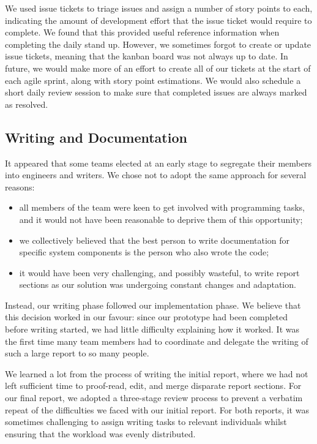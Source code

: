 We used issue tickets to triage issues and assign a number of story points to each, indicating the amount of development effort that the issue ticket would require to complete. We found that this provided useful reference information when completing the daily stand up. However, we sometimes forgot to create or update issue tickets, meaning that the kanban board was not always up to date. In future, we would make more of an effort to create all of our tickets at the start of each agile sprint, along with story point estimations. We would also schedule a short daily review session to make sure that completed issues are always marked as resolved.

\subsection{Writing and Documentation}
It appeared that some teams elected at an early stage to segregate their members into engineers and writers. We chose not to adopt the same approach for several reasons:

\begin{itemize}[noitemsep, topsep=1pt]
	\item all members of the team were keen to get involved with programming tasks, and it would not have been reasonable to deprive them of this opportunity;
	\item we collectively believed that the best person to write documentation for specific system components is the person who also wrote the code;
	\item it would have been very challenging, and possibly wasteful, to write report sections as our solution was undergoing constant changes and adaptation.
\end{itemize}

Instead, our writing phase followed our implementation phase. We believe that this decision worked in our favour: since our prototype had been completed before writing started, we had little difficulty explaining how it worked. It was the first time many team members had to coordinate and delegate the writing of such a large report to so many people. 

We learned a lot from the process of writing the initial report, where we had not left sufficient time to proof-read, edit, and merge disparate report sections. For our final report, we adopted a three-stage review process to prevent a verbatim repeat of the difficulties we faced with our initial report. For both reports, it was sometimes challenging to assign writing tasks to relevant individuals whilst ensuring that the workload was evenly distributed.


